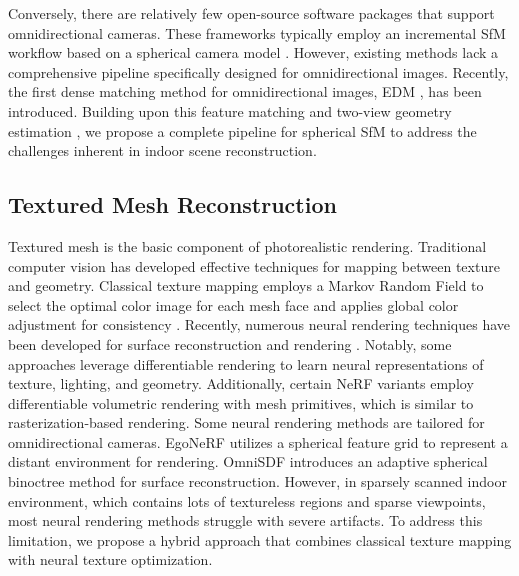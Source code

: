 Conversely, there are relatively few open-source software packages \cite{moulon2017openmvg,jiang20243d} that support omnidirectional cameras. 
These frameworks typically employ an incremental SfM workflow based on a spherical camera model \cite{jiang20243d}. 
However, existing methods lack a comprehensive pipeline specifically designed for omnidirectional images. 
Recently, the first dense matching method for omnidirectional images, EDM \cite{EDM}, has been introduced. 
Building upon this feature matching and two-view geometry estimation \cite{solarte2021robust}, we propose a complete pipeline for spherical SfM to address the challenges inherent in indoor scene reconstruction.


\subsection{Textured Mesh Reconstruction}
Textured mesh is the basic component of photorealistic rendering. Traditional computer vision has developed effective techniques for mapping between texture and geometry. Classical texture mapping \cite{lempitsky2007seamless,waechter2014TexRecon,fu2018texture} employs a Markov Random Field to select the optimal color image for each mesh face and applies global color adjustment for consistency \cite{waechter2014TexRecon}. Recently, numerous neural rendering techniques have been developed for surface reconstruction \cite{wang2021neus,yu2022monosdf,choi2023tmo,xiao2024debsdf} and rendering \cite{mildenhall2021nerf,barron2022mip,barron2023zip,kerbl20233d}. Notably, some approaches leverage differentiable rendering \cite{nvdiffrast,PyTorch3D,Mitsuba3,munkberg2021nvdiffrec,Goel_2022_CVPR} to learn neural representations of texture, lighting, and geometry. Additionally, certain NeRF variants \cite{SNeRG,chen2023mobilenerf,NeuRas,DNMP,Choi2024LTM} employ differentiable volumetric rendering with mesh primitives, which is similar to rasterization-based rendering. Some neural rendering methods are tailored for omnidirectional cameras. EgoNeRF \cite{choi2023balanced} utilizes a spherical feature grid to represent a distant environment for rendering. OmniSDF \cite{kim2024omnisdf} introduces an adaptive spherical binoctree method for surface reconstruction. However, in sparsely scanned indoor environment, which contains lots of textureless regions and sparse viewpoints, most neural rendering methods struggle with severe artifacts. To address this limitation, we propose a hybrid approach that combines classical texture mapping with neural texture optimization.



